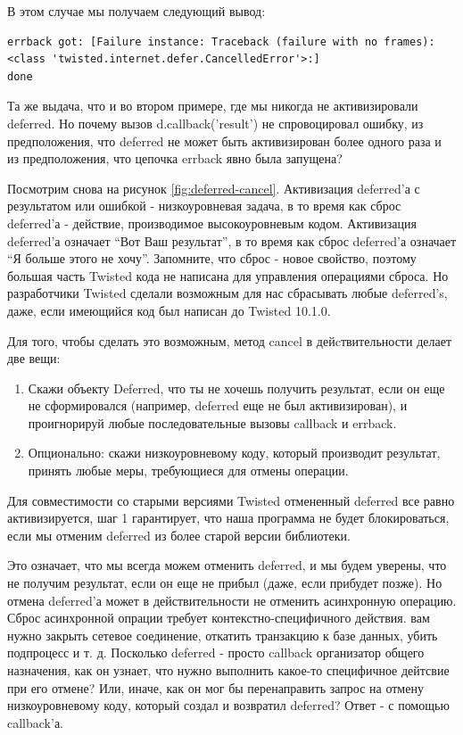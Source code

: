 В этом случае мы получаем следующий вывод:

\begin{scriptsize}\begin{verbatim}
errback got: [Failure instance: Traceback (failure with no frames): 
<class 'twisted.internet.defer.CancelledError'>:]
done
\end{verbatim}\end{scriptsize}


Та же выдача, что и во втором примере, где мы никогда не 
активизировали deferred. Но почему вызов d.callback('result') 
не спровоцировал ошибку, из предположения, что deferred не может 
быть активизирован более одного раза и из предположения, что 
цепочка errback явно была запущена?


Посмотрим снова на рисунок \ref{fig:deferred-cancel}. Активизация 
deferred'а с результатом или ошибкой -  низкоуровневая задача, 
в то время как сброс deferred'а - действие, производимое 
высокоуровневым кодом. Активизация deferred'а означает ``Вот Ваш результат'', 
в то время как сброс deferred'а означает ``Я больше этого не хочу''. 
Запомните, что сброс - новое свойство, поэтому большая часть Twisted 
кода не написана для управления операциями сброса. Но разработчики 
Twisted сделали возможным для нас сбрасывать любые deferred's, 
даже, если имеющийся код был написан до Twisted 10.1.0.


Для того, чтобы сделать это возможным, метод cancel 
в дейcтвительности делает две вещи:

\begin{enumerate}
\item Скажи объекту Deferred, что ты не хочешь получить результат, если он 
    еще не сформировался (например, deferred еще не был активизирован), и 
    проигнорируй любые последовательные вызовы callback и errback.

\item Опционально: скажи низкоуровневому коду, который производит результат, 
    принять любые меры, требующиеся для отмены операции.
\end{enumerate}


Для совместимости со старыми версиями Twisted 
отмененный deferred все равно активизируется, 
шаг 1 гарантирует, что наша программа не будет 
блокироваться, если  мы отменим deferred из более 
старой версии библиотеки.


Это означает, что мы всегда можем отменить deferred, и мы 
будем уверены, что не получим результат, если он еще не 
прибыл (даже, если прибудет позже). Но отмена deferred'а может 
в действительности не отменить асинхронную операцию. Сброс 
асинхронной опрации требует контекстно-специфичного действия. 
вам нужно закрыть сетевое соединение, откатить транзакцию к 
базе данных, убить подпроцесс и т. д. Посколько deferred - 
просто callback организатор общего назначения, как он 
узнает, что нужно выполнить какое-то специфичное дейтсвие при 
его отмене? Или, иначе, как он мог бы перенаправить запрос 
на отмену низкоуровневому коду, который создал и возвратил 
deferred? Ответ - с помощью callback'а. 

